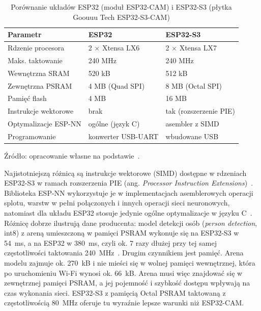 \begin{table}[htbp]
  \centering
  \caption{Porównanie układów ESP32 (moduł ESP32-CAM) i ESP32-S3 (płytka Goouuu Tech ESP32-S3-CAM)}
  \label{tab:esp32-vs-s3}
  \small
  \begin{tabular}{|l|l|l|}
    \hline
    \textbf{Parametr} & \textbf{ESP32} & \textbf{ESP32-S3} \\
    \hline
    Rdzenie procesora     & 2 $\times$ Xtensa LX6        & 2 $\times$ Xtensa LX7 \\
    Maks. taktowanie      & 240 MHz                      & 240 MHz \\
    Wewnętrzna SRAM       & 520 kB                       & 512 kB \\
    Zewnętrzna PSRAM      & 4 MB (Quad SPI)              & 8 MB (Octal SPI) \\
    Pamięć flash          & 4 MB                         & 16 MB \\
    Instrukcje wektorowe  & brak                         & tak (rozszerzenie PIE) \\
    Optymalizacje ESP-NN  & ogólne (język C)             & asembler z SIMD \\
    Programowanie         & konwerter USB-UART & wbudowane USB \\
    \hline
  \end{tabular}
 
  \vspace{2pt}
  {\footnotesize Źródło: opracowanie własne na podstawie~\cite{espressif_esp32_ds,espressif_esp32s3_ds,espressif_esp32s3_wroom1,aithinker_esp32cam,espressif_espnn}.}
\end{table}
 
Najistotniejszą różnicą są instrukcje wektorowe (SIMD) dostępne w rdzeniach
ESP32-S3 w ramach rozszerzenia PIE (ang. \emph{Processor Instruction
Extensions})~\cite{espressif_esp32s3_trm,espressif_pie_blog}. Biblioteka
ESP-NN wykorzystuje je w implementacjach asemblerowych operacji splotu,
warstw w pełni połączonych i innych operacji sieci neuronowych, natomiast
dla układu ESP32 stosuje jedynie ogólne optymalizacje w języku
C~\cite{espressif_espnn}. Różnicę dobrze ilustrują dane producenta:
model detekcji osób (\emph{person detection}, int8) z areną umieszczoną
w pamięci PSRAM wykonuje się na ESP32-S3 w 54~ms, a na ESP32 w 380~ms,
czyli ok. 7 razy dłużej przy tej samej częstotliwości taktowania
240~MHz~\cite{espressif_espnn}.
Drugim czynnikiem jest pamięć. Arena modelu zajmuje ok. 270~kB i nie mieści
się w wolnej pamięci wewnętrznej, która po uruchomieniu Wi-Fi wynosi ok.
66~kB. Arena musi więc znajdować się w zewnętrznej pamięci PSRAM, a jej
pojemność i szybkość dostępu wpływają na czas wykonania sieci. ESP32-S3
z pamięcią Octal PSRAM taktowaną z częstotliwością 80~MHz oferuje tu
wyraźnie lepsze warunki niż ESP32-CAM.
 

